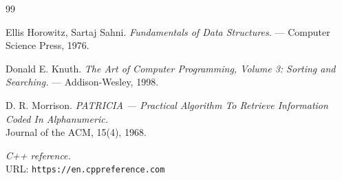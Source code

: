 \begin{thebibliography}{99}

    Ellis Horowitz, Sartaj Sahni. 
    {\itshape Fundamentals of Data Structures.} --- Computer Science Press, 1976.
    
    Donald E. Knuth. 
    {\itshape The Art of Computer Programming, Volume 3: Sorting and Searching.} --- Addison-Wesley, 1998.
    
    D. R. Morrison. 
    {\itshape PATRICIA --- Practical Algorithm To Retrieve Information Coded In Alphanumeric.} \\
    Journal of the ACM, 15(4), 1968.
    
    {\itshape C++ reference.} \\
    URL: \texttt{https://en.cppreference.com}
    
    \end{thebibliography}